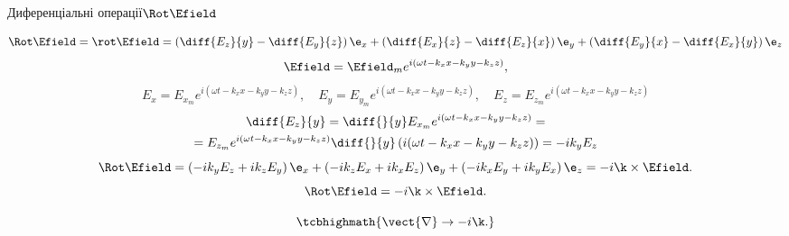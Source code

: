 \documentclass{beamer}
\begin{document}
\begin{frame}{Диференціальні операції}{$\Rot\Efield$}
\begin{block}{}
    \begin{equation*}
    \Rot\Efield = \rot\Efield =  \left(\diff{E_z}{y} - \diff{E_y}{z} \right)\e_x + \left(\diff{E_x}{z} - \diff{E_z}{x} \right)\e_y + \left(\diff{E_y}{x}
    -
    \diff{E_x}{y} \right)\e_z
\end{equation*}
\begin{equation*}
    \Efield = \Efield_me^{i(\omega t - k_xx - k_yy - k_zz)},
\end{equation*}
\begin{equation*}
    E_x = E_{x_m}e^{i(\omega t - k_xx - k_yy - k_zz)}, \quad
    E_y = E_{y_m}e^{i(\omega t - k_xx - k_yy - k_zz)}, \quad
    E_z = E_{z_m}e^{i(\omega t - k_xx - k_yy - k_zz)}
\end{equation*}
\begin{multline*}
    \diff{E_z}{y} = \diff{}{y} E_{x_m}e^{i(\omega t - k_xx - k_yy - k_zz)} = \\ = E_{z_m} e^{i(\omega t - k_xx - k_yy - k_zz)}  \diff{}{y}\left(
    i(\omega t -
    k_xx - k_yy - k_zz) \right) =
    -i k_yE_z
\end{multline*}
\begin{equation*}
    \Rot\Efield =  \left(  -i k_yE_z + i k_zE_y\right) \e_x + \left(  -i k_zE_x + i k_xE_z\right) \e_y + \left(  -i k_xE_y + i k_yE_x\right) \e_z =
    -i\k\times\Efield.
\end{equation*}
\begin{equation*}
    \Rot\Efield =  -i\k\times\Efield.
\end{equation*}
\end{block}
\begin{block}{}
    \begin{equation*}
    \tcbhighmath{\vect{\nabla} \to  -i\k.}
\end{equation*}
\end{block}
\end{frame}
\end{document}
